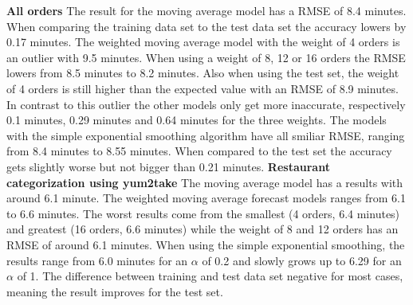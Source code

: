 \newline\newline\textbf{All orders}\newline
The result for the moving average model has a RMSE of 8.4 minutes. When comparing the training data set to the test data set the accuracy lowers by 0.17 minutes. The weighted moving average model with the weight of 4 orders is an outlier with 9.5 minutes. When using a weight of 8, 12 or 16 orders the RMSE lowers from 8.5 minutes to 8.2 minutes. Also when using the test set, the weight of 4 orders is still higher than the expected value with an RMSE of 8.9 minutes. In contrast to this outlier the other models only get more inaccurate, respectively 0.1 minutes, 0.29 minutes and 0.64 minutes for the three weights. The models with the simple exponential smoothing algorithm have all smiliar RMSE, ranging from 8.4 minutes to 8.55 minutes. When compared to the test set the accuracy gets slightly worse but not bigger than 0.21 minutes.
\newline\newline\textbf{Restaurant categorization using yum2take}\newline
 The moving average model has a results with around 6.1 minute. The weighted moving average forecast models ranges from 6.1 to 6.6 minutes. The worst results come from the smallest (4 orders, 6.4 minutes) and greatest (16 orders, 6.6 minutes) while the weight of 8 and 12 orders has an RMSE of around 6.1 minutes. When using the simple exponential smoothing, the results range from 6.0 minutes for an $\alpha$ of 0.2 and slowly grows up to 6.29 for an $\alpha$ of 1. The difference between training and test data set negative for most cases, meaning the result improves for the test set.
